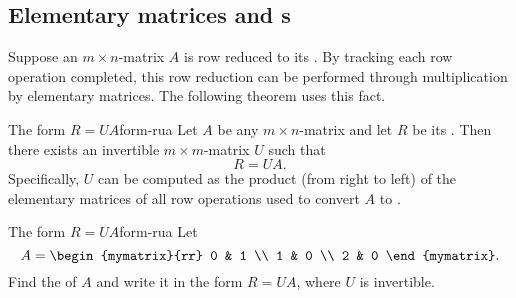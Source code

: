 \subsection{Elementary matrices and {\rref}s}

Suppose an $m\times n$-matrix $A$ is row reduced to its {\rref}. By
tracking each row operation completed, this row reduction can be
performed through multiplication by elementary matrices. The following
theorem uses this fact.

\begin{theorem}{The form $R=UA$}{form-rua}
  Let $A$ be any $m\times n$-matrix and let $R$ be its {\rref}. Then
  there exists an invertible $m\times m$-matrix $U$ such that
  \begin{equation*}
    R=UA.
  \end{equation*}
  Specifically, $U$ can be computed as the product (from right to
  left) of the elementary matrices of all row operations used to
  convert $A$ to {\rref}.
\end{theorem}

\begin{example}{The form $R=UA$}{form-rua}
  Let
  \begin{equation*}
    A = \begin{mymatrix}{rr}
      0 & 1 \\
      1 & 0 \\
      2 & 0
    \end{mymatrix}.
  \end{equation*}
  Find the {\rref} of $A$ and write it in the form $R=UA$, where $U$
  is invertible.
\end{example}

